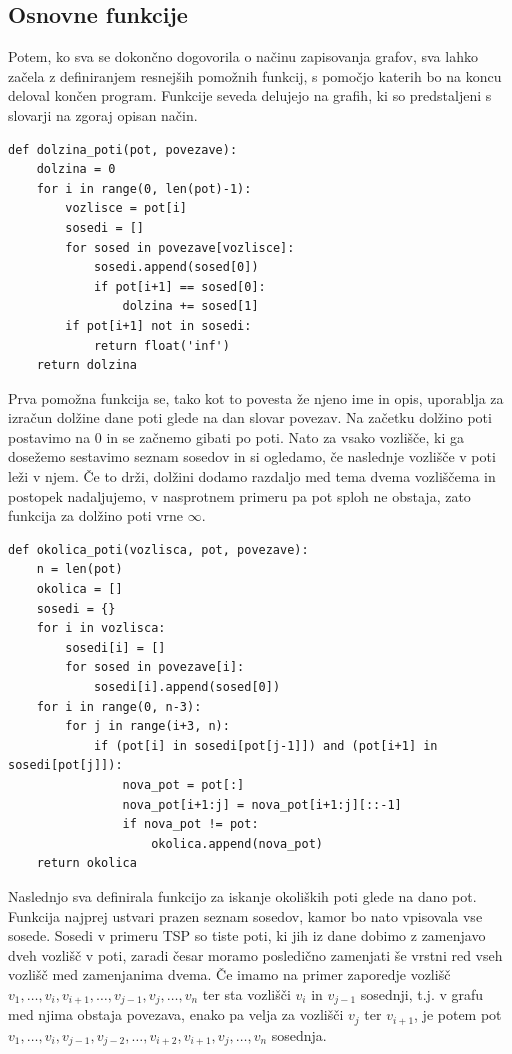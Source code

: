 \documentclass[10pt, a4paper]{article}
\begin{document}
\subsection{Osnovne funkcije}

Potem, ko sva se dokončno dogovorila o načinu zapisovanja grafov, sva lahko začela z definiranjem resnejših pomožnih funkcij, s pomočjo katerih bo na koncu deloval končen program. Funkcije seveda delujejo na grafih, ki so predstaljeni s slovarji na zgoraj opisan način.

\begin{verbatim}
def dolzina_poti(pot, povezave):
    dolzina = 0
    for i in range(0, len(pot)-1):
        vozlisce = pot[i]
        sosedi = []
        for sosed in povezave[vozlisce]:
            sosedi.append(sosed[0])
            if pot[i+1] == sosed[0]:
                dolzina += sosed[1]
        if pot[i+1] not in sosedi:
            return float('inf')
    return dolzina
\end{verbatim}

Prva pomožna funkcija se, tako kot to povesta že njeno ime in opis, uporablja za izračun dolžine dane poti glede na dan slovar povezav. Na začetku dolžino poti postavimo na 0 in se začnemo gibati po poti. Nato za vsako vozlišče, ki ga dosežemo sestavimo seznam sosedov in si ogledamo, če naslednje vozlišče v poti leži v njem. Če to drži, dolžini dodamo razdaljo med tema dvema vozliščema in postopek nadaljujemo, v nasprotnem primeru pa pot sploh ne obstaja, zato funkcija za dolžino poti vrne $\infty$.

\newpage

\begin{verbatim}
def okolica_poti(vozlisca, pot, povezave):
    n = len(pot)
    okolica = []
    sosedi = {}
    for i in vozlisca:
        sosedi[i] = []
        for sosed in povezave[i]:
            sosedi[i].append(sosed[0])
    for i in range(0, n-3):
        for j in range(i+3, n):
            if (pot[i] in sosedi[pot[j-1]]) and (pot[i+1] in sosedi[pot[j]]):
                nova_pot = pot[:]
                nova_pot[i+1:j] = nova_pot[i+1:j][::-1]
                if nova_pot != pot:
                    okolica.append(nova_pot)
    return okolica
\end{verbatim}

Naslednjo sva definirala funkcijo za iskanje okoliških poti glede na dano pot. Funkcija najprej ustvari prazen seznam sosedov, kamor bo nato vpisovala vse sosede. Sosedi v primeru TSP so tiste poti, ki jih iz dane dobimo z zamenjavo dveh vozlišč v poti, zaradi česar moramo posledično zamenjati še vrstni red vseh vozlišč med zamenjanima dvema. Če imamo na primer zaporedje vozlišč $v_1, \dots , v_i, v_{i+1}, \dots , v_{j-1}, v_j, \dots, v_n$ ter sta vozlišči $v_i$ in $v_{j-1}$ sosednji, t.j. v grafu med njima obstaja povezava, enako pa velja za vozlišči $v_j$ ter $v_{i+1}$, je potem pot $v_1, \dots , v_i, v_{j-1}, v_{j-2}, \dots ,v_{i+2}, v_{i+1}, v_j, \dots, v_n$ sosednja.  
\end{document}
